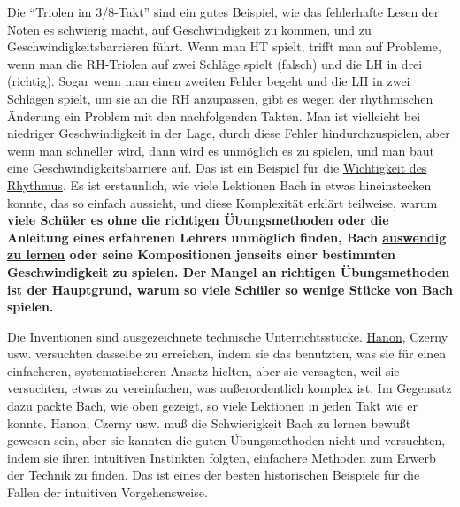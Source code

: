 Die \enquote{Triolen im 3/8-Takt} sind ein gutes Beispiel, wie das fehlerhafte Lesen der Noten es schwierig macht, auf Geschwindigkeit zu kommen, und zu Geschwindigkeitsbarrieren führt.
Wenn man HT spielt, trifft man auf Probleme, wenn man die RH-Triolen auf zwei Schläge spielt (falsch) und die LH in drei (richtig).
Sogar wenn man einen zweiten Fehler begeht und die LH in zwei Schlägen spielt, um sie an die RH anzupassen, gibt es wegen der rhythmischen Änderung ein Problem mit den nachfolgenden Takten.
Man ist vielleicht bei niedriger Geschwindigkeit in der Lage, durch diese Fehler hindurchzuspielen, aber wenn man schneller wird, dann wird es unmöglich es zu spielen, und man baut eine Geschwindigkeitsbarriere auf.
Das ist ein Beispiel für die \hyperref[c1iii1b]{Wichtigkeit des Rhythmus}.
Es ist erstaunlich, wie viele Lektionen Bach in etwas hineinstecken konnte, das so einfach aussieht, und diese Komplexität erklärt teilweise, warum \textbf{viele Schüler es ohne die richtigen Übungsmethoden oder die Anleitung eines erfahrenen Lehrers unmöglich finden, Bach \hyperref[c1iii6]{auswendig zu lernen} oder seine Kompositionen jenseits einer bestimmten Geschwindigkeit zu spielen.
Der Mangel an richtigen Übungsmethoden ist der Hauptgrund, warum so viele Schüler so wenige Stücke von Bach spielen.}

Die Inventionen sind ausgezeichnete technische Unterrichtsstücke.
\hyperref[c1iii7h]{Hanon}, Czerny usw. versuchten dasselbe zu erreichen, indem sie das benutzten, was sie für einen einfacheren, systematischeren Ansatz hielten, aber sie versagten, weil sie versuchten, etwas zu vereinfachen, was außerordentlich komplex ist.
Im Gegensatz dazu packte Bach, wie oben gezeigt, so viele Lektionen in jeden Takt wie er konnte.
Hanon, Czerny usw. muß die Schwierigkeit Bach zu lernen bewußt gewesen sein, aber sie kannten die guten Übungsmethoden nicht und versuchten, indem sie ihren intuitiven Instinkten folgten, einfachere Methoden zum Erwerb der Technik zu finden.
Das ist eines der besten historischen Beispiele für die Fallen der intuitiven Vorgehensweise.

